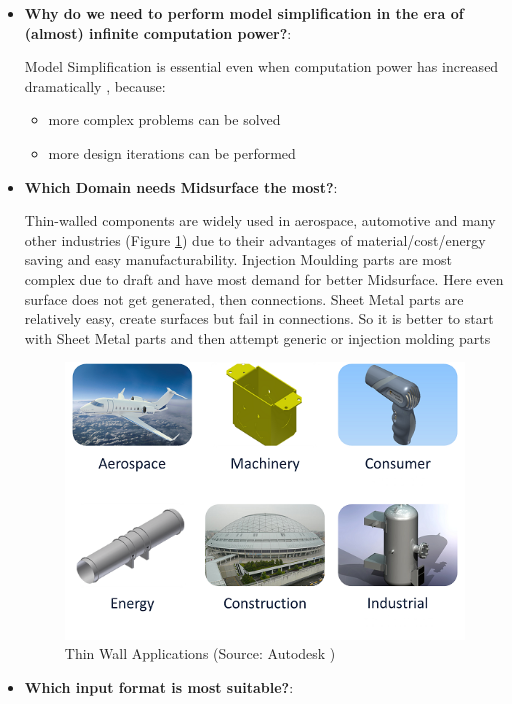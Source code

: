 \begin{itemize}[noitemsep,topsep=2pt,parsep=2pt,partopsep=2pt,leftmargin=*]
\item \textbf{Why do we need to perform model simplification in the era of (almost) infinite computation power?}:


Model Simplification is essential even when computation power has increased dramatically \cite{Stolt2005}, because:
	\begin{itemize}[noitemsep,topsep=2pt,parsep=2pt,partopsep=2pt,leftmargin=*]
	\item more complex problems can be solved
	\item more design iterations can be performed
	\end{itemize}
	
	
\item \textbf{Which Domain needs Midsurface the most?}: 

Thin-walled components are widely used in aerospace, automotive and many other industries (Figure \ref{fig:litsurvey:ThinWallApplications}) due to their advantages of material/cost/energy saving and easy manufacturability.  Injection Moulding parts are most complex due to draft and have most demand for better Midsurface. Here even surface does not get generated, then connections. Sheet Metal parts are relatively easy, create surfaces but fail in connections. So it is better to start with Sheet Metal parts and then attempt generic or injection molding parts



	\begin{figure} [!h]
		\centering
		\includegraphics[width=0.6\linewidth]{images/ThinWallApplications}
		\caption{Thin Wall Applications (Source: Autodesk \cite{SheetMetalAutodesk})}
		\label{fig:litsurvey:ThinWallApplications}
	\end{figure}
	


\item \textbf{Which input format is most suitable?}: 


\end{itemize}
